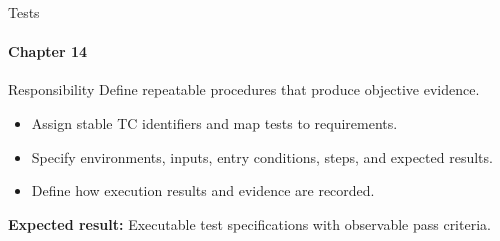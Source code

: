 \begin{frame}{Tests}
\framesubtitle{Chapter 14}
\begin{block}{Responsibility}
Define repeatable procedures that produce objective evidence.
\end{block}
\begin{itemize}
  \item Assign stable TC identifiers and map tests to requirements.
  \item Specify environments, inputs, entry conditions, steps, and expected results.
  \item Define how execution results and evidence are recorded.
\end{itemize}
\vspace{0.15cm}
\textbf{Expected result:} Executable test specifications with observable pass criteria.
\end{frame}
